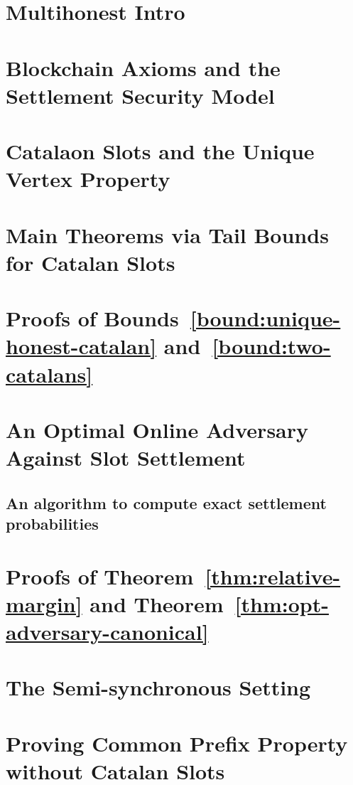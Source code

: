 \chapter{Multihonest Intro}\label{ch:intro-multihonest}


\chapter{Blockchain Axioms and the Settlement Security Model}\label{sec:model-multihonest}

\label{sec:definitions-multihonest}



\chapter{Catalaon Slots and the Unique Vertex Property}\label{sec:catalan}


\chapter{Main Theorems via Tail Bounds for Catalan Slots}\label{sec:bounds-main-proofs-multihonest}


\chapter{Proofs of Bounds~\ref{bound:unique-honest-catalan} and~\ref{bound:two-catalans}}\label{sec:estimates-multihonest}


\chapter{An Optimal Online Adversary Against Slot Settlement}\label{sec:recursion-multihonest}

\section{An algorithm to compute exact settlement probabilities}\label{sec:exact-prob-multihonest}


\chapter{Proofs of Theorem~\ref{thm:relative-margin} and Theorem~\ref{thm:opt-adversary-canonical}}\label{sec:margin-proof-multihonest}


\chapter{The Semi-synchronous Setting}\label{sec:async-multihonest}\label{sec:async-model-multihonest}



\chapter{Proving Common Prefix Property without Catalan Slots}\label{sec:cp-multihonest}\label{sec:cp-model-multihonest}



